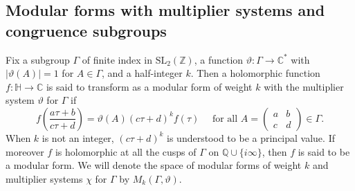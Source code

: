 \documentclass{article}
\theoremstyle{definition}
\newcommand{\CC} {{\mathbb C}}          %
\newcommand{\ZZ} {{\mathbb Z}}		%
\newcommand{\QQ} {{\mathbb Q}}		%
\begin{document}
\subsection{Modular forms with multiplier systems and congruence subgroups}

Fix a
subgroup $\Gamma$ of finite index in $\mathrm{SL_2}( \ZZ)$, a function $\vartheta \colon
\Gamma \to  \CC^{\ast}$ with $|\vartheta(A)|=1$ for $A \in \Gamma$, and a half-integer $k$.
Then a holomorphic function $f \colon \mathbb{H} \to  \CC$ is said to transform as a modular
form of weight $k$ with the multiplier system $\vartheta$ for $\Gamma$ if
\[ f\left( \frac{a\tau+b}{c\tau+d}\right)=\vartheta(A)(c\tau+d)^k f(\tau) \quad 
\textrm{ for all } A=\begin{pmatrix}
a & b \\ c & d
\end{pmatrix} \in \Gamma. \]
When $k$ is not an integer, $(c\tau+d)^k$ is understood to be a principal value. If moreover
$f$ is holomorphic at all the cusps of $\Gamma$ on $ \QQ \cup \{i \infty\}$, then $f$ is said
to be a modular form. We will denote the space of modular forms of weight $k$ and multiplier
systems $\chi$ for $\Gamma$ by $M_k(\Gamma, \vartheta)$.
\end{document}
